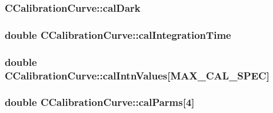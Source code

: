 \label{classCCalibrationCurve_a30ff71dcb7acaca69bc0a169e77681f1}
\hypertarget{classCCalibrationCurve_a824fa0eb0c09eba9bacb327e2647e304}{
\subsubsection[{calDark}]{ {\bf CCalibrationCurve::calDark}}}
\label{classCCalibrationCurve_a824fa0eb0c09eba9bacb327e2647e304}
\hypertarget{classCCalibrationCurve_a3625101f7dc3ae37e347b36bb51b2605}{
\subsubsection[{calIntegrationTime}]{\setlength{\rightskip}{0pt plus 5cm}double {\bf CCalibrationCurve::calIntegrationTime}}}
\label{classCCalibrationCurve_a3625101f7dc3ae37e347b36bb51b2605}
\hypertarget{classCCalibrationCurve_a1ca7dd8bfec2fee56e6f35a5fcc344bf}{
\subsubsection[{calIntnValues}]{\setlength{\rightskip}{0pt plus 5cm}double {\bf CCalibrationCurve::calIntnValues}\mbox{[}MAX\_\-CAL\_\-SPEC\mbox{]}}}
\label{classCCalibrationCurve_a1ca7dd8bfec2fee56e6f35a5fcc344bf}
\hypertarget{classCCalibrationCurve_a2b0f4f43bd32a1b4484ddcd29e3632e5}{
\subsubsection[{calParms}]{\setlength{\rightskip}{0pt plus 5cm}double {\bf CCalibrationCurve::calParms}\mbox{[}4\mbox{]}}}
